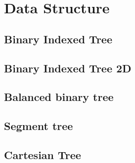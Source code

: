 \newpage
\section{Data Structure}

\subsection{Binary Indexed Tree}


\subsection{Binary Indexed Tree 2D}


\subsection{Balanced binary tree}

\subsection{Segment tree}


\subsection{Cartesian Tree}
